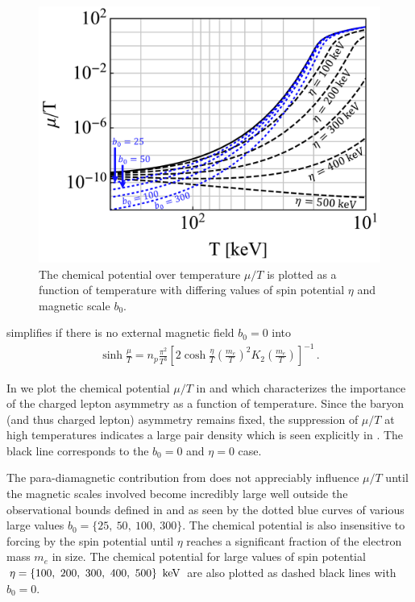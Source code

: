 \begin{figure}[ht]
 \centering
 \includegraphics[clip, trim=0.0cm 0.0cm 0.0cm 0.0cm,width=0.95\linewidth]{plots/chap04cosmo/thesis_chempot_fixed.pdf}
 \caption{The chemical potential over temperature $\mu/T$ is plotted as a function of temperature with differing values of spin potential $\eta$ and magnetic scale $b_{0}$.}
 \label{fig:chemicalpotential}
\end{figure}

 simplifies if there is no external magnetic field $b_{0}=0$ into
\begin{align}
    \label{simpchem:1}
    \sinh\frac{\mu}{T}=n_{p}\frac{\pi^{2}}{T^{3}}\left[2\cosh\frac{\eta}{T}\left(\frac{m_{e}}{T}\right)^{2}K_{2}\left(\frac{m_{e}}{T}\right)\right]^{-1}\,.
\end{align}

In  we plot the chemical potential $\mu/T$ in  and  which characterizes the importance of the charged lepton asymmetry as a function of temperature. Since the baryon (and thus charged lepton) asymmetry remains fixed, the suppression of $\mu/T$ at high temperatures indicates a large pair density which is seen explicitly in . The black line corresponds to the $b_{0}=0$ and $\eta=0$ case. 

The para-diamagnetic contribution from  does not appreciably influence $\mu/T$ until the magnetic scales involved become incredibly large well outside the observational bounds defined in  and  as seen by the dotted blue curves of various large values $b_{0}=\{25,\ 50,\ 100,\ 300\}$. The chemical potential is also insensitive to forcing by the spin potential until $\eta$ reaches a significant fraction of the electron mass $m_{e}$ in size. The chemical potential for large values of spin potential $\eta=\{100,\ 200,\ 300,\ 400,\ 500\}\,\text{ keV}$ are also plotted as dashed black lines with $b_{0}=0$.

